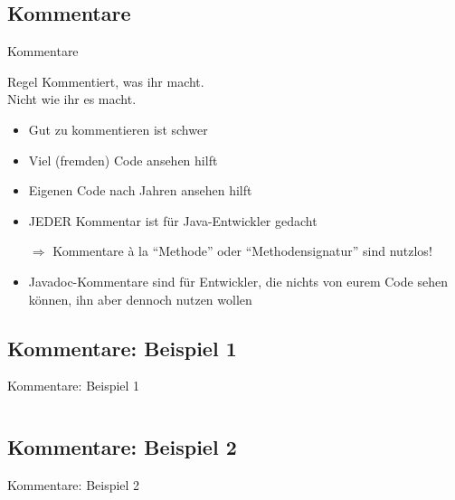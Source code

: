 \documentclass[usepdftitle=false,hyperref={pdfpagelabels=false}]{beamer}
\begin{document}
\subsection{Kommentare}
\begin{frame}{Kommentare}
    \begin{block}{Regel}
        Kommentiert, was ihr macht. \\
        Nicht wie ihr es macht.
    \end{block}

    \begin{itemize}[<+->]
        \item Gut zu kommentieren ist schwer
        \item Viel (fremden) Code ansehen hilft
        \item Eigenen Code nach Jahren ansehen hilft
        \item JEDER Kommentar ist für Java-Entwickler gedacht
        \item[$\Rightarrow$] Kommentare à la "`Methode"' oder 
              "`Methodensignatur"' sind nutzlos!\\
        \item Javadoc-Kommentare sind für Entwickler, die nichts von 
              eurem Code sehen können, ihn aber dennoch nutzen wollen
    \end{itemize}
\end{frame}

\subsection{Kommentare: Beispiel 1}
\begin{frame}{Kommentare: Beispiel 1}
    \inputminted[linenos=true, numbersep=5pt, tabsize=4, fontsize=\tiny]{java}{Kommentare-1.java}

\end{frame}

\subsection{Kommentare: Beispiel 2}
\begin{frame}{Kommentare: Beispiel 2}
    \inputminted[linenos=true, numbersep=5pt, tabsize=4, fontsize=\small]{java}{Kommentare-2.java}
\end{frame}
\end{document}
